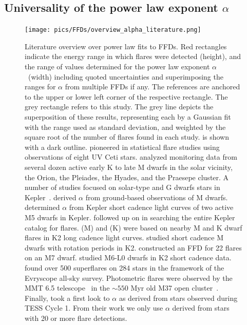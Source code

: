 \documentclass{aa}
\begin{document}
\subsection{Universality of the power law exponent $\alpha$}
\label{sec:sec:universal}
   \begin{figure}[t!]
   \centering
            \texttt{[image: pics/FFDs/overview\_alpha\_literature.png]}
         \caption{Literature overview over power law fits to FFDs. Red rectangles indicate the energy range in which flares were detected (height), and the range of values determined for the power law exponent $\alpha$~(width) including quoted uncertainties and superimposing the ranges for $\alpha$ from multiple FFDs if any. The references are anchored to the upper or lower left corner of the respective rectangle. The grey rectangle refers to this study. The grey line depicts the superposition of these results, representing each by a Gaussian fit with the range used as standard deviation, and weighted by the square root of the number of flares found in each study.  is shown with a dark outline. \citet{lacy_uv_1976} pioneered in statistical flare studies using observations of eight UV Ceti stars. \citet{shakhovskaya_stellar_1989} analyzed monitoring data from several dozen active early K to late M dwarfs in the solar vicinity, the Orion, the Pleiades, the Hyades, and the Praesepe cluster. A number of studies focused on solar-type and G dwarfs stars in Kepler~\citep{shibayama2013,wu2015}. \citet{hilton2011} derived $\alpha$ from ground-based observations of M dwarfs. \citet{lurie2015} determined $\alpha$ from Kepler short cadence light curves of two active M5 dwarfs in Kepler. %
       \citet{yang_flaring_2017} followed up on \citet{davenport_kepler_2016} in searching the entire Kepler catalog for flares. \citet{lin2019} (M) and (K) were based on nearby M and K dwarf flares in K2 long cadence light curves. \citep{raetz2020} studied short cadence M dwarfs with rotation periods in K2. \citet{gizis_k2_2017-1} constructed an FFD for 22 flares on an M7 dwarf. \citet{paudel2018} studied M6-L0 dwarfs in K2 short cadence data. \citet{howard2019} found over 500 superflares on 284 stars in the framework of the Evryscope all-sky survey. Photometric flares were observed by the MMT 6.5 telescope~\citep{hartman2008} in the $\sim550$ Myr old M37 open cluster~\citep{chang2015}. Finally, \citep{guenther2020} took a first look to $\alpha$ as derived from stars observed during TESS Cycle 1. From their work we only use $\alpha$ derived from stars with 20 or more flare detections.
}
          \label{fig:powerlaw_literature}
     
   \end{figure}
\end{document}
